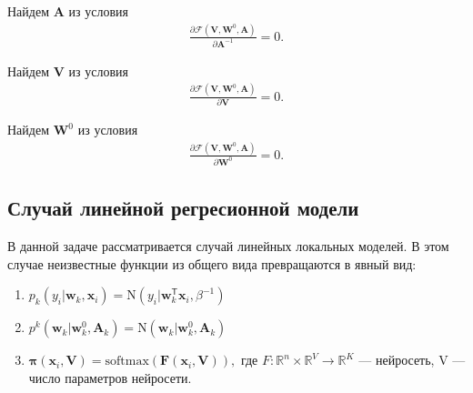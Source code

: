 \documentclass[12pt, twoside]{article}
\numberwithin{equation}{section}
\begin{document}
Найдем $\textbf{A}$ из условия
\begin{equation}
\label{eq:st:8}
\begin{aligned}
\frac{\partial \mathcal{F}\left(\textbf{V}, \textbf{W}^{0}, \textbf{A}\right)}{\partial \textbf{A}^{-1}} = 0.
\end{aligned}
\end{equation}

Найдем $\textbf{V}$ из условия
\begin{equation}
\label{eq:st:9}
\begin{aligned}
\frac{\partial \mathcal{F}\left(\textbf{V}, \textbf{W}^{0}, \textbf{A}\right)}{\partial \textbf{V}} = 0.
\end{aligned}
\end{equation}

Найдем $\textbf{W}^{0}$ из условия
\begin{equation}
\label{eq:st:10}
\begin{aligned}
\frac{\partial \mathcal{F}\left(\textbf{V}, \textbf{W}^{0}, \textbf{A}\right)}{\partial \textbf{W}^{0}} = 0.
\end{aligned}
\end{equation}

\subsection{Случай линейной регресионной модели}
В данной задаче рассматривается случай линейных локальных моделей. В этом случае неизвестные функции из общего вида превращаются в явный вид:
\begin{enumerate}
	\item $p_{k}\left(y_{i}|\textbf{w}_{k}, \textbf{x}_{i}\right) = \text{N}\left(y_{i}|\textbf{w}_{k}^{\mathsf{T}}\textbf{x}_{i}, \beta^{-1}\right)$
	\item $p^{k}\left(\textbf{w}_{k}|\textbf{w}^{0}_{k}, \textbf{A}_{k}\right) = \text{N}\left(\textbf{w}_{k}|\textbf{w}^{0}_{k}, \textbf{A}_{k}\right)$
	\item $\bm{\pi}\left(\textbf{x}_{i}, \textbf{V}\right) = \text{softmax}\left(\textbf{F}\left(\textbf{x}_{i}, \textbf{V}\right)\right),$ где $F : \mathbb{R}^{n}\times\mathbb{R}^{V}\to \mathbb{R}^{K}$ --- нейросеть, V --- число параметров нейросети. 
\end{enumerate}
\end{document}
